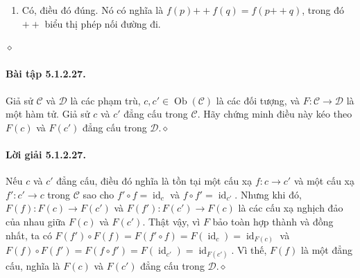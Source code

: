 \begin{enumerate}[label=\alph*.]
\begin{center}
\begin{tabular}{|c|c|}
\multicolumn{2}{|c|}{$f_1:\operatorname{Path}_G\to\operatorname{Path}_{G'}$}\\\hline
$\operatorname{Path}_G$&$\operatorname{Path}_{G'}$\\\hline
${}_{1}[\ ]$&${}_{1'}[\ ]$\\\hline
${}_{1}[a]$&${}_{1'}[w]$\\\hline
${}_{1}[a,b]$&${}_{1'}[w,x]$\\\hline
${}_{1}[c]$&${}_{1'}[y]$\\\hline
${}_{1}[d]$&${}_{1'}[y]$\\\hline
${}_{2}[\ ]$&${}_{2'}[\ ]$\\\hline
${}_{2}[b]$&${}_{2'}[x]$\\\hline
${}_{3}[\ ]$&${}_{1'}[\ ]$\\\hline
${}_{4}[\ ]$&${}_{4'}[\ ]$\\\hline
${}_{5}[\ ]$&${}_{5'}[\ ]$\\\hline
${}_{5}[e]$&${}_{5'}[z]$\\\hline
${}_{6}[\ ]$&${}_{5'}[\ ]$\\\hline
\end{tabular}
\end{center}
\item Có, điều đó đúng. Nó có nghĩa là $f(p)\mathbin{+\!+}f(q)=f(p\mathbin{+\!+}q)$, trong đó $\mathbin{+\!+}$ biểu thị phép nối đường đi.
\end{enumerate}\hfill$\diamond$
\paragraph{Bài tập 5.1.2.27.} Giả sử $\mathcal C$ và $\mathcal D$ là các phạm trù, $c,c'\in\operatorname{Ob}(\mathcal C)$ là các đối tượng, và $F:\mathcal C\to\mathcal D$ là một hàm tử. Giả sử $c$ và $c'$ đẳng cấu trong $\mathcal C$. Hãy chứng minh điều này kéo theo $F(c)$ và $F(c')$ đẳng cấu trong $\mathcal D$.\hfill$\diamond$
\paragraph{Lời giải 5.1.2.27.} Nếu $c$ và $c'$ đẳng cấu, điều đó nghĩa là tồn tại một cấu xạ $f:c\to c'$ và một cấu xạ $f':c'\to c$ trong $\mathcal C$ sao cho $f'\circ f=\operatorname{id}_c$ và $f\circ f'=\operatorname{id}_{c'}$. Nhưng khi đó, $F(f):F(c)\to F(c')$ và $F(f'):F(c')\to F(c)$ là các cấu xạ nghịch đảo của nhau giữa $F(c)$ và $F(c')$. Thật vậy, vì $F$ bảo toàn hợp thành và đồng nhất, ta có $F(f')\circ F(f)=F(f'\circ f)=F(\operatorname{id}_c)=\operatorname{id}_{F(c)}$ và $F(f)\circ F(f')=F(f\circ f')=F(\operatorname{id}_{c'})=\operatorname{id}_{F(c')}$. Vì thế, $F(f)$ là một đẳng cấu, nghĩa là $F(c)$ và $F(c')$ đẳng cấu trong $\mathcal D$.\hfill$\diamond$
